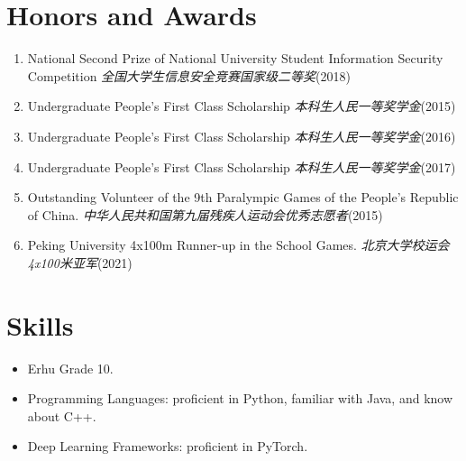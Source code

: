 \documentclass{resume}
\begin{document}
\section{Honors and Awards}
\begin{enumerate}
  \item National Second Prize of National University Student Information Security Competition \textit{全国大学生信息安全竞赛国家级二等奖}(2018)
  \item Undergraduate People's First Class Scholarship \textit{本科生人民一等奖学金}(2015)
  \item Undergraduate People's First Class Scholarship \textit{本科生人民一等奖学金}(2016)
  \item Undergraduate People's First Class Scholarship \textit{本科生人民一等奖学金}(2017)
  \item Outstanding Volunteer of the 9th Paralympic Games of the People's Republic of China. \textit{中华人民共和国第九届残疾人运动会优秀志愿者}(2015)
  \item Peking University 4x100m Runner-up in the School Games. \textit{北京大学校运会4x100米亚军}(2021)
\end{enumerate}


\section{Skills}
\begin{itemize}
  \item Erhu Grade 10.
  \item Programming Languages: proficient in Python, familiar with Java, and know about C++.
  \item Deep Learning Frameworks: proficient in PyTorch.
\end{itemize}

%
%
\end{document}
